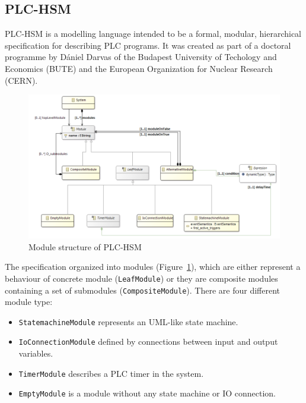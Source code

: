 
\subsection{PLC-HSM}
\label{sub:plchsm}

PLC-HSM is a modelling language intended to be a formal,
modular, hierarchical specification for describing PLC programs. It was created as part of a doctoral programme by Dániel Darvas of the Budapest University of Techology and Economics (BUTE) and the European Organization for Nuclear Research (CERN).

\begin{figure}[htp]
\centering
\includegraphics[scale=0.4]{figures/plchsm_modules}
\caption{Module structure of PLC-HSM}
\label{fig:plchsm_modules}
\end{figure}

The specification organized into modules (Figure~\ref{fig:plchsm_modules}), which are either represent a behaviour of concrete module (\texttt{LeafModule}) or they are composite modules containing a set of submodules (\texttt{CompositeModule}). There are four different module type:

\begin{itemize}
	\item \texttt{StatemachineModule} represents an UML-like state machine.
	\item \texttt{IoConnectionModule} defined by connections between input and output variables.
	\item \texttt{TimerModule} describes a PLC timer in the system.
	\item \texttt{EmptyModule} is a module without any state machine or IO connection.
\end{itemize}

